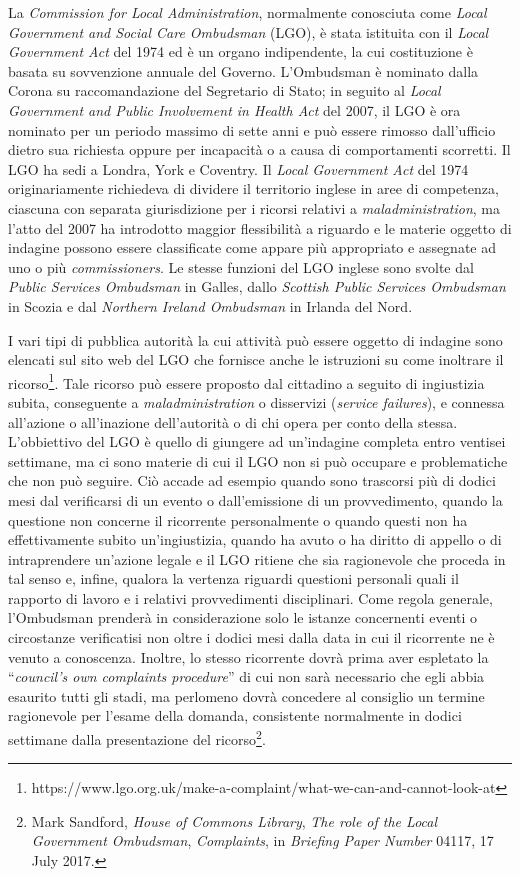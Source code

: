 \documentclass[12pt,it,a4paper,]{report}
\begin{document}
La \emph{Commission for Local Administration}, normalmente conosciuta
come \emph{Local Government and Social Care Ombudsman} (LGO), è stata
istituita con il \emph{Local Government Act} del 1974 ed è un organo
indipendente, la cui costituzione è basata su sovvenzione annuale del
Governo. L'Ombudsman è nominato dalla Corona su raccomandazione del
Segretario di Stato; in seguito al \emph{Local Government and Public
Involvement in Health Act} del 2007, il LGO è ora nominato per un
periodo massimo di sette anni e può essere rimosso dall'ufficio dietro
sua richiesta oppure per incapacità o a causa di comportamenti
scorretti. Il LGO ha sedi a Londra, York e Coventry. Il \emph{Local
Government Act} del 1974 originariamente richiedeva di dividere il
territorio inglese in aree di competenza, ciascuna con separata
giurisdizione per i ricorsi relativi a \emph{maladministration}, ma
l'atto del 2007 ha introdotto maggior flessibilità a riguardo e le
materie oggetto di indagine possono essere classificate come appare più
appropriato e assegnate ad uno o più \emph{commissioners}. Le stesse
funzioni del LGO inglese sono svolte dal \emph{Public Services
Ombudsman} in Galles, dallo \emph{Scottish Public Services Ombudsman} in
Scozia e dal \emph{Northern Ireland Ombudsman} in Irlanda del Nord.

I vari tipi di pubblica autorità la cui attività può essere oggetto di
indagine sono elencati sul sito web del LGO che fornisce anche le
istruzioni su come inoltrare il ricorso\footnote{https://www.lgo.org.uk/make-a-complaint/what-we-can-and-cannot-look-at}.
Tale ricorso può essere proposto dal cittadino a seguito di ingiustizia
subita, conseguente a \emph{maladministration} o disservizi
(\emph{service failures}), e connessa all'azione o all'inazione
dell'autorità o di chi opera per conto della stessa. L'obbiettivo del
LGO è quello di giungere ad un'indagine completa entro ventisei
settimane, ma ci sono materie di cui il LGO non si può occupare e
problematiche che non può seguire. Ciò accade ad esempio quando sono
trascorsi più di dodici mesi dal verificarsi di un evento o
dall'emissione di un provvedimento, quando la questione non concerne il
ricorrente personalmente o quando questi non ha effettivamente subito
un'ingiustizia, quando ha avuto o ha diritto di appello o di
intraprendere un'azione legale e il LGO ritiene che sia ragionevole che
proceda in tal senso e, infine, qualora la vertenza riguardi questioni
personali quali il rapporto di lavoro e i relativi provvedimenti
disciplinari. Come regola generale, l'Ombudsman prenderà in
considerazione solo le istanze concernenti eventi o circostanze
verificatisi non oltre i dodici mesi dalla data in cui il ricorrente ne
è venuto a conoscenza. Inoltre, lo stesso ricorrente dovrà prima aver
espletato la ``\emph{council's own complaints procedure}'' di cui non
sarà necessario che egli abbia esaurito tutti gli stadi, ma perlomeno
dovrà concedere al consiglio un termine ragionevole per l'esame della
domanda, consistente normalmente in dodici settimane dalla presentazione
del ricorso\footnote{Mark Sandford, \emph{House of Commons Library},
  \emph{The role of the Local Government Ombudsman}, \emph{Complaints},
  in \emph{Briefing Paper Number} 04117, 17 July 2017.}.
\end{document}
